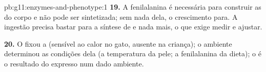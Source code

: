 \begin{solution}{pb:g11:enzymes-and-phenotype:1}
\textbf{19.} A fenilalanina é necessária para construir as  do
corpo e não pode ser sintetizada; sem nada dela, o crescimento para. A
ingestão precisa bastar para a síntese de  e nada mais, o que
exige medir e ajustar.

\textbf{20.} O  fixou a  (sensível ao calor no gato,
ausente na criança); o ambiente determinou as condições dela (a
temperatura da pele; a fenilalanina da dieta); o  é o resultado
do  expresso num dado ambiente.
\end{solution}
